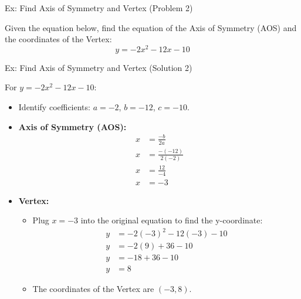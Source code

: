 \documentclass[aspectratio=169]{beamer}
\begin{document}
\begin{frame}{Ex: Find Axis of Symmetry and Vertex (Problem 2)}
    \begin{tcolorbox}[colback=lightgray,colframe=primary,title=Problem 2]
        \footnotesize
        Given the equation below, find the equation of the Axis of Symmetry (AOS) and the coordinates of the Vertex:\\
        \[ y = -2x^2 - 12x - 10 \]
    \end{tcolorbox}
\end{frame}

\begin{frame}{Ex: Find Axis of Symmetry and Vertex (Solution 2)}
    \begin{tcolorbox}[colback=lightgray,colframe=accent,title=Solution 2]
        \footnotesize
        For $y = -2x^2 - 12x - 10$:
        \begin{itemize}
            \item Identify coefficients: $a=-2$, $b=-12$, $c=-10$.
            \item \textbf{Axis of Symmetry (AOS):}
                \begin{align*}
                    x &= \frac{-b}{2a} \\
                    x &= \frac{-(-12)}{2(-2)} \\
                    x &= \frac{12}{-4} \\
                    x &= -3
                \end{align*}
            \item \textbf{Vertex:}
                \begin{itemize}
                    \item Plug $x=-3$ into the original equation to find the y-coordinate:
                        \begin{align*}
                            y &= -2(-3)^2 - 12(-3) - 10 \\
                            y &= -2(9) + 36 - 10 \\
                            y &= -18 + 36 - 10 \\
                            y &= 8
                        \end{align*}
                    \item The coordinates of the Vertex are $(-3, 8)$.
                \end{itemize}
        \end{itemize}
    \end{tcolorbox}
\end{frame}
\end{document}
